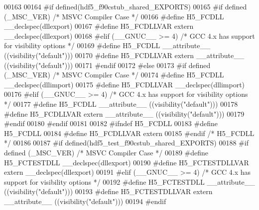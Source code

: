 \begin{DoxyCode}
00163 
00164 \textcolor{preprocessor}{#if defined(hdf5\_f90cstub\_shared\_EXPORTS)}
00165 \textcolor{preprocessor}{  #if defined (\_MSC\_VER)  }\textcolor{comment}{/* MSVC Compiler Case */}\textcolor{preprocessor}{}
00166 \textcolor{preprocessor}{    #define H5\_FCDLL \_\_declspec(dllexport)}
00167 \textcolor{preprocessor}{    #define H5\_FCDLLVAR extern \_\_declspec(dllexport)}
00168 \textcolor{preprocessor}{  #elif (\_\_GNUC\_\_ >= 4)  }\textcolor{comment}{/* GCC 4.x has support for visibility options */}\textcolor{preprocessor}{}
00169 \textcolor{preprocessor}{    #define H5\_FCDLL \_\_attribute\_\_ ((visibility("default")))}
00170 \textcolor{preprocessor}{    #define H5\_FCDLLVAR extern \_\_attribute\_\_ ((visibility("default")))}
00171 \textcolor{preprocessor}{  #endif}
00172 \textcolor{preprocessor}{#else}
00173 \textcolor{preprocessor}{  #if defined (\_MSC\_VER)  }\textcolor{comment}{/* MSVC Compiler Case */}\textcolor{preprocessor}{}
00174 \textcolor{preprocessor}{    #define H5\_FCDLL \_\_declspec(dllimport)}
00175 \textcolor{preprocessor}{    #define H5\_FCDLLVAR \_\_declspec(dllimport)}
00176 \textcolor{preprocessor}{  #elif (\_\_GNUC\_\_ >= 4)  }\textcolor{comment}{/* GCC 4.x has support for visibility options */}\textcolor{preprocessor}{}
00177 \textcolor{preprocessor}{    #define H5\_FCDLL \_\_attribute\_\_ ((visibility("default")))}
00178 \textcolor{preprocessor}{    #define H5\_FCDLLVAR extern \_\_attribute\_\_ ((visibility("default")))}
00179 \textcolor{preprocessor}{  #endif}
00180 \textcolor{preprocessor}{#endif}
00181 
00182 \textcolor{preprocessor}{#ifndef H5\_FCDLL}
00183 \textcolor{preprocessor}{  #define H5\_FCDLL}
00184 \textcolor{preprocessor}{  #define H5\_FCDLLVAR extern}
00185 \textcolor{preprocessor}{#endif }\textcolor{comment}{/* H5\_FCDLL */}\textcolor{preprocessor}{}
00186 
00187 \textcolor{preprocessor}{#if defined(hdf5\_test\_f90cstub\_shared\_EXPORTS)}
00188 \textcolor{preprocessor}{  #if defined (\_MSC\_VER)  }\textcolor{comment}{/* MSVC Compiler Case */}\textcolor{preprocessor}{}
00189 \textcolor{preprocessor}{    #define H5\_FCTESTDLL \_\_declspec(dllexport)}
00190 \textcolor{preprocessor}{    #define H5\_FCTESTDLLVAR extern \_\_declspec(dllexport)}
00191 \textcolor{preprocessor}{  #elif (\_\_GNUC\_\_ >= 4)  }\textcolor{comment}{/* GCC 4.x has support for visibility options */}\textcolor{preprocessor}{}
00192 \textcolor{preprocessor}{    #define H5\_FCTESTDLL \_\_attribute\_\_ ((visibility("default")))}
00193 \textcolor{preprocessor}{    #define H5\_FCTESTDLLVAR extern \_\_attribute\_\_ ((visibility("default")))}
00194 \textcolor{preprocessor}{  #endif}

\end{DoxyCode}

